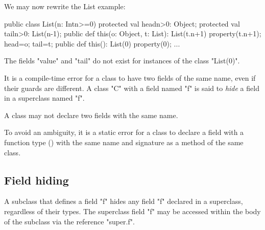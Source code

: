 \begin{example}

We may now rewrite the List example:
\begin{xten}
public class List(n: Int{n>=0}) {
  protected val head{n>0}: Object;
  protected val tail{n>0}: List(n-1);
  public def this(o: Object, t: List): List(t.n+1) {
     property(t.n+1);
     head=o;
     tail=t;
  }
  public def this(): List(0) {
     property(0);
  }
  ...
}
\end{xten}

The fields \xcd"value" and \xcd"tail" do not exist for instances of the class
\xcd"List(0)".
\end{example}

It is a compile-time error for a class to have two fields of the same
name, even if their guards are different. A class \xcd"C" with a field
named \xcd"f" is said to {\em hide} a field in a superclass named \xcd"f".

\begin{staticrule*}
     A class may not declare two fields with the same name.
\end{staticrule*}

To avoid an ambiguity, it is a static error for a class to
declare a field with a function type () with
the same name and signature  as a method of the same class.

\subsection{Field hiding}

A subclass that defines a field \xcd"f" hides any field \xcd"f"
declared in a superclass, regardless of their types.  The
superclass field \xcd"f" may be accessed within the body of
the subclass via the reference \xcd"super.f".



